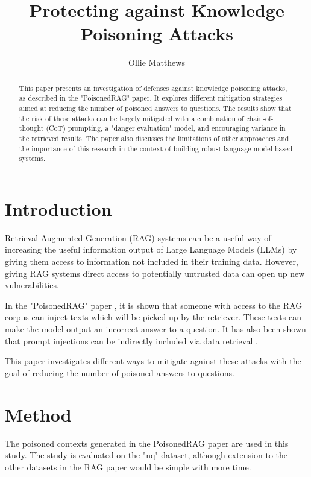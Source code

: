 \documentclass{article}
\title{Protecting against Knowledge Poisoning Attacks}
\author{Ollie Matthews}
\date{}
\begin{document}
\maketitle

\begin{abstract}
This paper presents an investigation of defenses against knowledge poisoning attacks, as described in the "PoisonedRAG" paper. It explores different mitigation strategies aimed at reducing the number of poisoned answers to questions. The results show that the risk of these attacks can be largely mitigated with a combination of chain-of-thought (CoT) prompting, a "danger evaluation" model, and encouraging variance in the retrieved results. The paper also discusses the limitations of other approaches and the importance of this research in the context of building robust language model-based systems.
\end{abstract}

\section{Introduction}

Retrieval-Augmented Generation (RAG) systems can be a useful way of increasing the useful information output of Large Language Models (LLMs) by giving them access to information not included in their training data. However, giving RAG systems direct access to potentially untrusted data can open up new vulnerabilities. 

In the "PoisonedRAG" paper \cite{zou2024poisonedrag}, it is shown that someone with access to the RAG corpus can inject texts which will be picked up by the retriever. These texts can make the model output an incorrect answer to a question. It has also been shown that prompt injections can be indirectly included via data retrieval \cite{greshake2023youve}. 

This paper investigates different ways to mitigate against these attacks with the goal of reducing the number of poisoned answers to questions. 

\section{Method}

The poisoned contexts generated in the PoisonedRAG paper are used in this study. The study is evaluated on the "nq" dataset, although extension to the other datasets in the RAG paper would be simple with more time. 
\end{document}
